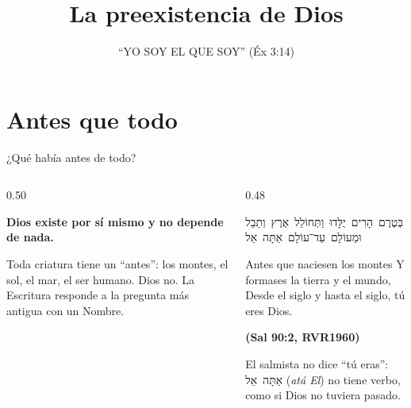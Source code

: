 \documentclass[hyperref={bookmarks=false},aspectratio=169]{beamer}
\title[La preexistencia]{\bfseries{La preexistencia de Dios}}
\subtitle{``YO SOY EL QUE SOY'' (Éx 3:14)}
\author{}\institute{}\date{}
\newcommand{\heb}[1]{\mbox{\foreignlanguage{hebrew}{#1}}}
\newcommand{\fuente}[1]{\par\hfill{\upshape\bfseries\footnotesize\textcolor{azul}{#1}}}
\newcommand{\destacar}[1]{\textbf{\textcolor{azul}{#1}}}
\begin{document}
\frame{\titlepage}


\section{Antes que todo}

\begin{frame}{¿Qué había antes de todo?}
\begin{columns}[c,onlytextwidth]
\begin{column}{0.50\textwidth}
\begin{tcolorbox}[colback=papiro,colframe=dorado,boxrule=1.2pt,arc=3pt]
\centering\small \destacar{Dios existe por sí mismo y no depende de nada.}
\end{tcolorbox}
\small\RaggedRight Toda criatura tiene un ``antes'': los montes, el sol, el mar, el ser humano. Dios no. La Escritura responde a la pregunta más antigua con un Nombre.
\end{column}
\begin{column}{0.48\textwidth}
\begin{center}\heb{בְּטֶרֶם הָרִים יֻלָּדוּ וַתְּחוֹלֵל אֶרֶץ וְתֵבֵל}\\[1pt]\heb{וּמֵעוֹלָם עַד־עוֹלָם אַתָּה אֵל}\end{center}
\begin{cita}Antes que naciesen los montes Y formases la tierra y el mundo, Desde el siglo y hasta el siglo, tú eres Dios.\fuente{(Sal 90:2, RVR1960)}\end{cita}
\scriptsize El salmista no dice ``tú eras'': \heb{אַתָּה אֵל} (\emph{atá El}) no tiene verbo, como si Dios no tuviera pasado.
\end{column}
\end{columns}
\end{frame}
\end{document}
